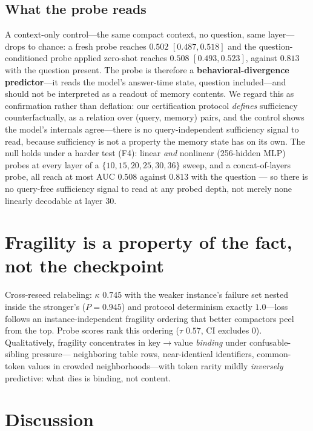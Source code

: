 \documentclass[11pt]{article}
\begin{document}
\subsection{What the probe reads}
\label{sec:reads}
A context-only control---the same compact context, no question, same
layer---drops to chance: a fresh probe reaches $0.502$ $[0.487, 0.518]$ and
the question-conditioned probe applied zero-shot reaches $0.508$ $[0.493,
0.523]$, against $0.813$ with the question present. The probe is therefore a
\textbf{behavioral-divergence predictor}---it reads the model's answer-time
state, question included---and should not be interpreted as a readout of
memory contents. We regard this as confirmation rather than deflation: our
certification protocol \emph{defines} sufficiency counterfactually, as a
relation over (query, memory) pairs, and the control shows the model's
internals agree---there is no query-independent sufficiency signal to read,
because sufficiency is not a property the memory state has on its own.
The null holds under a harder test (F4): linear \emph{and} nonlinear
(256-hidden MLP) probes at every layer of a $\{10,15,20,25,30,36\}$ sweep,
and a concat-of-layers probe, all reach at most AUC $0.508$ against $0.813$
with the question --- so there is no query-free sufficiency signal to read
at any probed depth, not merely none linearly decodable at layer 30.

\section{Fragility is a property of the fact, not the checkpoint}
\label{sec:fragility}
Cross-reseed relabeling: $\kappa$ $0.745$ with the weaker instance's failure
set nested inside the stronger's ($P{=}0.945$) and protocol determinism
exactly $1.0$---loss follows an instance-independent fragility ordering that
better compactors peel from the top. Probe scores rank this ordering ($\tau$
$0.57$, CI excludes $0$). Qualitatively, fragility concentrates in
key$\rightarrow$value \emph{binding} under confusable-sibling pressure---
neighboring table rows, near-identical identifiers, common-token values in
crowded neighborhoods---with token rarity mildly \emph{inversely} predictive:
what dies is binding, not content.

\section{Discussion}
\end{document}
